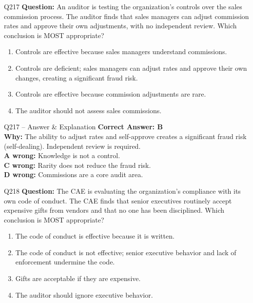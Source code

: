 \documentclass[aspectratio=169,10pt]{beamer}
\begin{document}
	\begin{frame}[t]{Q217}
		\small
		\textbf{Question:} An auditor is testing the organization's controls over the sales commission process. The auditor finds that sales managers can adjust commission rates and approve their own adjustments, with no independent review. Which conclusion is MOST appropriate?
		\begin{enumerate}[label=\Alph*.,itemsep=1pt,topsep=2pt]
			\item Controls are effective because sales managers understand commissions.
			\item Controls are deficient; sales managers can adjust rates and approve their own changes, creating a significant fraud risk.
			\item Controls are effective because commission adjustments are rare.
			\item The auditor should not assess sales commissions.
		\end{enumerate}
	\end{frame}
	
	\begin{frame}[t]{Q217 -- Answer \& Explanation}
		\small
		\textbf{Correct Answer: B} \\[4pt]
		\textbf{Why:} The ability to adjust rates and self-approve creates a significant fraud risk (self-dealing). Independent review is required. \\[4pt]
		\textbf{A wrong:} Knowledge is not a control. \\[2pt]
		\textbf{C wrong:} Rarity does not reduce the fraud risk. \\[2pt]
		\textbf{D wrong:} Commissions are a core audit area.
	\end{frame}
	
	\begin{frame}[t]{Q218}
		\small
		\textbf{Question:} The CAE is evaluating the organization's compliance with its own code of conduct. The CAE finds that senior executives routinely accept expensive gifts from vendors and that no one has been disciplined. Which conclusion is MOST appropriate?
		\begin{enumerate}[label=\Alph*.,itemsep=1pt,topsep=2pt]
			\item The code of conduct is effective because it is written.
			\item The code of conduct is not effective; senior executive behavior and lack of enforcement undermine the code.
			\item Gifts are acceptable if they are expensive.
			\item The auditor should ignore executive behavior.
		\end{enumerate}
	\end{frame}
	
\end{document}
